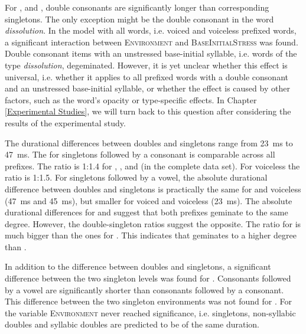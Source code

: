 For ,  and , double consonants are significantly longer than corresponding singletons. The only exception might be the double consonant in the word \textit{dissolution}. In the model with all words, i.e. voiced and voiceless pre\-fix\-ed words, a significant interaction between \textsc{Environment} and \textsc{BaseInitialStress} was found. Double consonant items with an unstressed base-initial syllable, i.e. words of the type \textit{dissolution}, degeminated. However, it is yet unclear whether this effect is universal, i.e. whether it applies to all prefixed words with a double consonant and an unstressed base-initial syllable,  or whether the effect is caused by other factors, such as the word's opacity or type-specific effects. In Chapter \ref{Experimental Studies}, we will turn back to this question after considering the results of the experimental study.\largerpage

The durational differences between doubles and singletons range from 23~ms to 47~ms.  The   for singletons followed by a consonant is comparable across all prefixes. The ratio is 1:1.4 for , , and  (in the complete data set). For voiceless  the ratio is 1:1.5.
For singletons followed by a vowel, the absolute durational difference between doubles and singletons is practically the same for  and voiceless  (47~ms and 45~ms), but smaller for voiced and voiceless  (23~ms). The absolute durational differences for  and  suggest that both prefixes geminate to the same degree. However, the double-singleton ratios suggest the opposite. The ratio for  is much bigger than the ones for . This indicates that  geminates to a higher degree than .\pagebreak


In addition to the difference between doubles and singletons, a significant difference between the two singleton levels was found for . Consonants followed by a vowel are significantly shorter than consonants followed by a consonant. This difference between the two singleton environments was not found for . For  the variable \textsc{Environment} never reached significance, i.e. singletons, non-syllabic doubles and syllabic doubles are predicted to be of the same duration.

